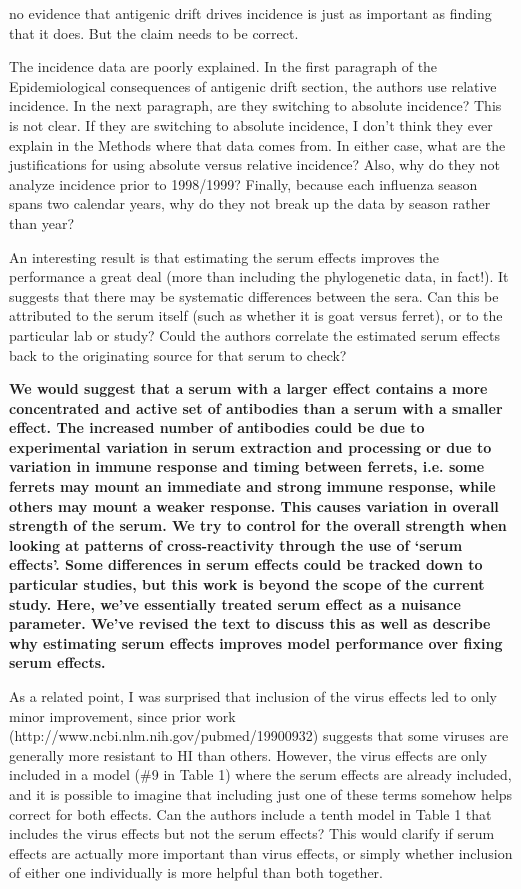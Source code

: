 \documentclass[11pt,oneside,letterpaper]{article}
\begin{document}
no evidence that antigenic drift drives incidence is just as important as finding that it does. But the claim needs to be correct.

The incidence data are poorly explained. In the first paragraph of the Epidemiological consequences of antigenic drift section, the authors use relative incidence. In the next paragraph, are they switching to absolute incidence? This is not clear. If they are switching to absolute incidence, I don't think they ever explain in the Methods where that data comes from. In either case, what are the justifications for using absolute versus relative incidence? Also, why do they not analyze incidence prior to 1998/1999? Finally, because each influenza season spans two calendar years, why do they not break up the data by season rather than year?

An interesting result is that estimating the serum effects improves the performance a great deal (more than including the phylogenetic data, in fact!). It suggests that there may be systematic differences between the sera. Can this be attributed to the serum itself (such as whether it is goat versus ferret), or to the particular lab or study? Could the authors correlate the estimated serum effects back to the originating source for that serum to check? 

\textbf{We would suggest that a serum with a larger effect contains a more concentrated and active set of antibodies than a serum with a smaller effect. The increased number of antibodies could be due to experimental variation in serum extraction and processing or due to variation in immune response and timing between ferrets, i.e. some ferrets may mount an immediate and strong immune response, while others may mount a weaker response.  This causes variation in overall strength of the serum.  We try to control for the overall strength when looking at patterns of cross-reactivity through the use of `serum effects'.  Some differences in serum effects could be tracked down to particular studies, but this work is beyond the scope of the current study.  Here, we've essentially treated serum effect as a nuisance parameter.  We've revised the text to discuss this as well as describe why estimating serum effects improves model performance over fixing serum effects.}

As a related point, I was surprised that inclusion of the virus effects led to only minor improvement, since prior work (http://www.ncbi.nlm.nih.gov/pubmed/19900932) suggests that some viruses are generally more resistant to HI than others. However, the virus effects are only included in a model (\#9 in Table 1) where the serum effects are already included, and it is possible to imagine that including just one of these terms somehow helps correct for both effects. Can the authors include a tenth model in Table 1 that includes the virus effects but not the serum effects? This would clarify if serum effects are actually more important than virus effects, or simply whether inclusion of either one individually is more helpful than both together.
\end{document}
